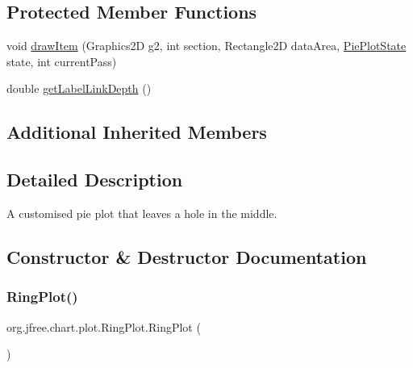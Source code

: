 \subsection*{Protected Member Functions}
\begin{DoxyCompactItemize}
\item 
void \mbox{\hyperlink{classorg_1_1jfree_1_1chart_1_1plot_1_1_ring_plot_a931487f50cbc9b440fcd8e4913440e93}{draw\+Item}} (Graphics2D g2, int section, Rectangle2D data\+Area, \mbox{\hyperlink{classorg_1_1jfree_1_1chart_1_1plot_1_1_pie_plot_state}{Pie\+Plot\+State}} state, int current\+Pass)
\item 
double \mbox{\hyperlink{classorg_1_1jfree_1_1chart_1_1plot_1_1_ring_plot_a8fbcbaa4e5d9d50a5206319add39ae2d}{get\+Label\+Link\+Depth}} ()
\end{DoxyCompactItemize}
\subsection*{Additional Inherited Members}


\subsection{Detailed Description}
A customised pie plot that leaves a hole in the middle. 

\subsection{Constructor \& Destructor Documentation}
\mbox{\label{classorg_1_1jfree_1_1chart_1_1plot_1_1_ring_plot_aa197d815798695cbd5b0ce74f1d95f41}} 
\subsubsection{\texorpdfstring{Ring\+Plot()}{RingPlot()}\hspace{0.1cm}{\footnotesize\ttfamily [1/2]}}
{\footnotesize\ttfamily org.\+jfree.\+chart.\+plot.\+Ring\+Plot.\+Ring\+Plot (\begin{DoxyParamCaption}{ }\end{DoxyParamCaption})}

